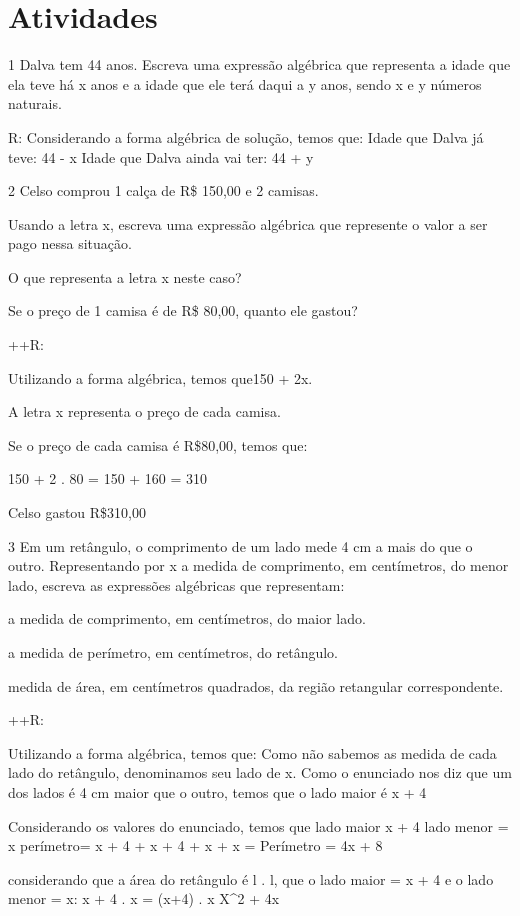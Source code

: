 {\section{Atividades}

\num{1} Dalva tem 44 anos. Escreva uma expressão algébrica que representa a
idade que ela teve há x anos e a idade que ele terá daqui a y anos,
sendo x e y números naturais.

R: Considerando a forma algébrica de solução, temos que:
Idade que Dalva já teve: 44 - x
Idade que Dalva ainda vai ter: 44 + y

\num{2} Celso comprou 1 calça de R\$ 150,00 e 2 camisas.
\item Usando a letra x, escreva uma expressão algébrica que represente o
valor a ser pago nessa situação.
\item O que representa a letra x neste caso?
\item Se o preço de 1 camisa é de R\$ 80,00, quanto ele gastou?

++R: 
\item Utilizando a forma algébrica, temos que150 + 2x.
\item A letra x representa o preço de cada camisa.
\item Se o preço de cada camisa é R\$80,00, temos que:

150 + 2 . 80 = 150 + 160 = 310

Celso gastou R\$310,00

\num{3} Em um retângulo, o comprimento de um lado mede 4 cm a mais do que o
outro. Representando por x a medida de comprimento, em centímetros, do
menor lado, escreva as expressões algébricas que representam:
\item a medida de comprimento, em centímetros, do maior lado.
\item a medida de perímetro, em centímetros, do retângulo.
\item medida de área, em centímetros quadrados, da região retangular
correspondente.

++R:
\item Utilizando a forma algébrica, temos que:
Como não sabemos as medida de cada lado do retângulo, denominamos seu
lado de x. Como o enunciado nos diz que um dos lados é 4 cm maior que o
outro, temos que o lado maior é
x + 4
\item Considerando os valores do enunciado, temos que
lado maior x + 4
lado menor = x
perímetro= x + 4 + x + 4 + x + x =
Perímetro = 4x + 8
\item considerando que a área do retângulo é l . l, que o lado maior = x +
4 e o lado menor = x:
x + 4 . x =
(x+4) . x
X^2 + 4x

}
